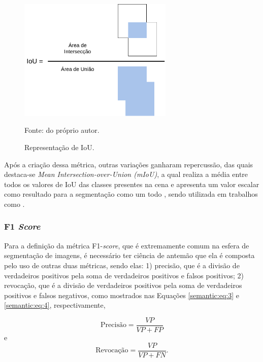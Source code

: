 \begin{figure}[H]
    \centering
    \caption{Representação de IoU.}
    \includegraphics[height=2.3in]{recursos/imagens/semantic/IoU.png}
    \label{semantic:fig:1}

    Fonte: do próprio autor.
\end{figure}

\begin{sloppypar}
Após a criação dessa métrica, outras variações ganharam repercussão, das quais destaca-se \textit{Mean Intersection-over-Union (mIoU)}, a qual realiza a média entre todos os valores de IoU das classes presentes na cena e apresenta um valor escalar como resultado para a segmentação como um todo \cite{Minaee2021}, sendo utilizada em trabalhos como \cite{Mohan2020}.
\end{sloppypar}


\subsubsection{F1 \textit{Score}}
\label{semantic:f1}
Para a definição da métrica F1-\textit{score}, que é extremamente comum na esfera de segmentação de imagens, é necessário ter ciência de antemão que ela é composta pelo uso de outras duas métricas, sendo elas: 1) precisão, que é a divisão de verdadeiros positivos pela soma de verdadeiros positivos e falsos positivos; 2) revocação, que é a divisão de verdadeiros positivos pela soma de verdadeiros positivos e falsos negativos, como mostrados nas Equações \ref{semantic:eq:3} e \ref{semantic:eq:4}, respectivamente,

\begin{equation}
    \label{semantic:eq:3}
    \text{Precisão} = \frac{VP}{VP + FP}
\end{equation}
e
\begin{equation}
    \label{semantic:eq:4}
    \text{Revocação} = \frac{VP}{VP + FN}.
\end{equation}

